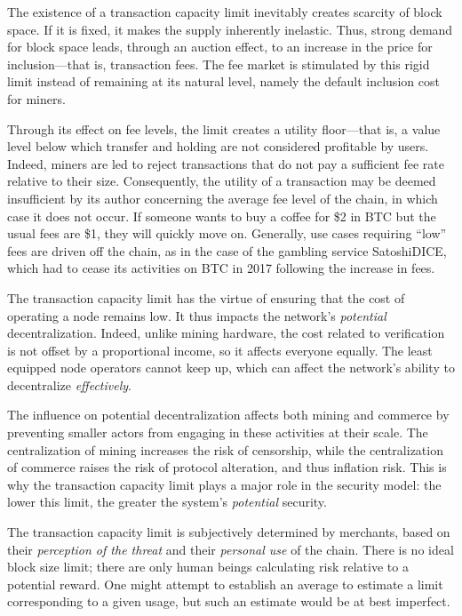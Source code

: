 \documentclass[
  a5paper,
  smalldemyvopaper,10pt,twoside,onecolumn,openright,extrafontsizes,hidelinks]{memoir}
\begin{document}
The existence of a transaction capacity limit inevitably creates
scarcity of block space. If it is fixed, it makes the supply inherently
inelastic. Thus, strong demand for block space leads, through an auction
effect, to an increase in the price for inclusion---that is, transaction
fees. The fee market is stimulated by this rigid limit instead of
remaining at its natural level, namely the default inclusion cost for
miners.

Through its effect on fee levels, the limit creates a utility
floor---that is, a value level below which transfer and holding are not
considered profitable by users. Indeed, miners are led to reject
transactions that do not pay a sufficient fee rate relative to their
size. Consequently, the utility of a transaction may be deemed
insufficient by its author concerning the average fee level of the
chain, in which case it does not occur. If someone wants to buy a coffee
for \$2 in BTC but the usual fees are \$1, they will quickly move on.
Generally, use cases requiring ``low'' fees are driven off the chain, as
in the case of the gambling service SatoshiDICE, which had to cease its
activities on BTC in 2017 following the increase in fees.

The transaction capacity limit has the virtue of ensuring that the cost
of operating a node remains low. It thus impacts the network's
\emph{potential} decentralization. Indeed, unlike mining hardware, the
cost related to verification is not offset by a proportional income, so
it affects everyone equally. The least equipped node operators cannot
keep up, which can affect the network's ability to decentralize
\emph{effectively}.

The influence on potential decentralization affects both mining and
commerce by preventing smaller actors from engaging in these activities
at their scale. The centralization of mining increases the risk of
censorship, while the centralization of commerce raises the risk of
protocol alteration, and thus inflation risk. This is why the
transaction capacity limit plays a major role in the security model: the
lower this limit, the greater the system's \emph{potential} security.

The transaction capacity limit is subjectively determined by merchants,
based on their \emph{perception of the threat} and their \emph{personal
use} of the chain. There is no ideal block size limit; there are only
human beings calculating risk relative to a potential reward. One might
attempt to establish an average to estimate a limit corresponding to a
given usage, but such an estimate would be at best imperfect.
\end{document}
